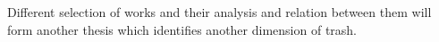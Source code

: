 Different selection of works and their analysis and relation between them will form another thesis which identifies another dimension of trash.







